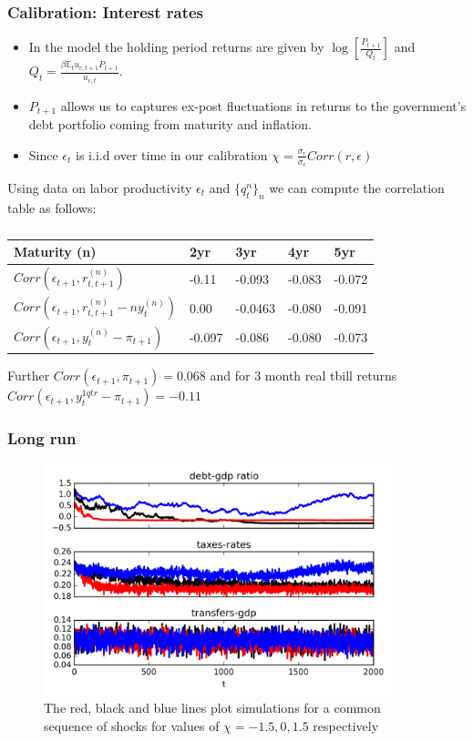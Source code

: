\documentclass{beamer}
\begin{document}
\begin{frame}
 \frametitle{Calibration: Interest rates}
 \small
 \begin{itemize}
  \item In the model the holding period returns are given by $\log\left[\frac{P_{t+1}}{Q_{t}}\right]$ and $Q_t=\frac{\beta \mathbb{E}_tu_{c,t+1}P_{t+1}}{u_{c,t}}$. 
\item $P_{t+1}$ allows us to captures ex-post fluctuations in returns to the government's debt  portfolio coming from maturity and inflation. 
\item Since $\epsilon_{t}$ is i.i.d over time in our calibration  $\chi=\frac{\sigma_{r}}{\sigma_{\epsilon}} Corr(r,\epsilon)$
 \end{itemize}

 Using data on labor productivity $\epsilon_{t}$ and $\{q^{n}_t\}_{n}$ we can compute the correlation table as follows:
 
\begin{table}[htp]
\small
\begin{tabular}{|l|l| l|l|l|}
\hline
Maturity (n) &2yr & 3yr & 4yr & 5yr\\
\hline
$Corr(\epsilon_{t+1},r^{(n)}_{t,t+1})$ & -0.11 &-0.093 &-0.083 &-0.072\\
$Corr(\epsilon_{t+1},r^{(n)}_{t,t+1}-ny^{(n)}_{t})$& 0.00 & -0.0463 &-0.080& -0.091\\
$Corr(\epsilon_{t+1},y^{(n)}_{t}-\pi_{t+1})$ &-0.097  &-0.086  &-0.080  &-0.073 \\ 
\hline
\end{tabular}
\caption{}
\label{tab:corr}
\end{table}
Further $Corr(\epsilon_{t+1},\pi_{t+1})=0.068$ and for 3 month real tbill returns $Corr(\epsilon_{t+1},y^{1 qtr}_{t}-\pi_{t+1})=-0.11$
 
\end{frame}




\begin{frame}
\frametitle{Long run}
 {
  \begin{figure}
    \centering
    \includegraphics[width = 0.9\textwidth]{cesplots/long_simulation_debt.png}
    \caption{The red, black and blue lines plot simulations for a common sequence of shocks for values of $\chi=-1.5,0,1.5$ respectively}
  \end{figure}

}

\end{frame}
\end{document}
